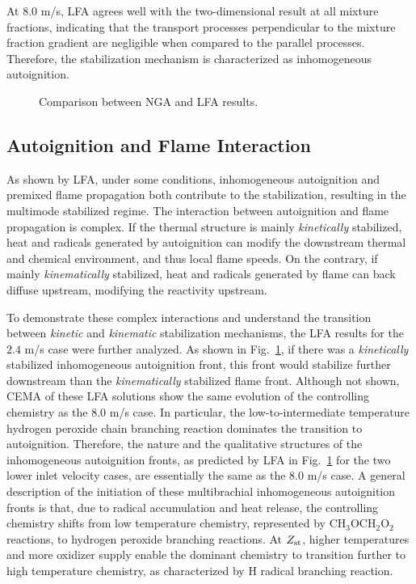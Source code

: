 \documentclass{wssci}
\begin{document}
At $8.0$ m/s, LFA agrees well with the two-dimensional result at all mixture fractions, indicating that the transport processes perpendicular to the mixture fraction gradient are negligible when compared to the parallel processes.  Therefore, the stabilization mechanism is characterized as inhomogeneous autoignition.

\begin{figure}
  \centering
  \scriptsize
  \resizebox{0.8\textwidth}{!}{}
  \normalsize
  \vspace{-0.2in}
  \caption{Comparison between NGA and LFA results.}
  \label{fig:LFA_V}
\end{figure}

\subsection{Autoignition and Flame Interaction}

As shown by LFA, under some conditions, inhomogeneous autoignition and premixed flame propagation both contribute to the stabilization, resulting in the multimode stabilized regime.  The interaction between autoignition and flame propagation is complex.  If the thermal structure is mainly \emph{kinetically} stabilized, heat and radicals generated by autoignition can modify the  downstream thermal and chemical environment, and thus local flame speeds.  On the contrary, if mainly \emph{kinematically} stabilized, heat and radicals generated by flame can back diffuse upstream, modifying the reactivity upstream.  

To demonstrate these complex interactions and understand the transition between \emph{kinetic} and \emph{kinematic} stabilization mechanisms, the LFA results for the $2.4$ m/s case were further analyzed.  As shown in Fig.~\ref{fig:LFA_V}, if there was a \emph{kinetically} stabilized inhomogeneous autoignition front, this front would stabilize further downstream than the \emph{kinematically} stabilized flame front.  Although not shown, CEMA of these LFA solutions show the same evolution of the controlling chemistry as the $8.0$ m/s case.  In particular, the low-to-intermediate temperature hydrogen peroxide chain branching reaction dominates the transition to autoignition.  Therefore, the nature and the qualitative structures of the inhomogeneous autoignition fronts, as predicted by LFA in Fig.~\ref{fig:LFA_V} for the two lower inlet velocity cases, are essentially the same as the $8.0$ m/s case.  A general description of the initiation of these multibrachial inhomogeneous autoignition fronts is that, due to radical accumulation and heat release, the controlling chemistry shifts from low temperature chemistry, represented by CH$_3$OCH$_2$O$_2$ reactions, to hydrogen peroxide branching reactions.  At $Z_{\rm st}$, higher temperatures and more oxidizer supply enable the dominant chemistry to transition further to high temperature chemistry, as characterized by H radical branching reaction.   
\end{document}
